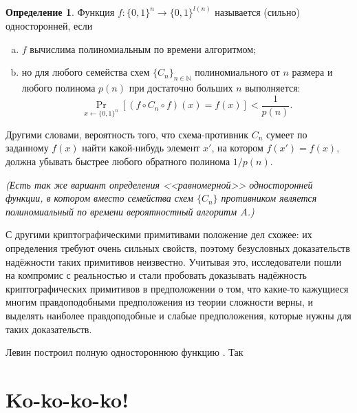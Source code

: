\documentclass[oneside, a4paper]{article}
\theoremstyle{definition}
\newtheorem{definition}{Определение}
\theoremstyle{remark}
\begin{document}
\begin{definition}
Функция $f : \{0, 1\}^n \to \{0, 1\}^{l(n)}$ называется (сильно) односторонней,
если
\begin{enumerate}[(a)]
\item $f$ вычислима полиномиальным по времени алгоритмом;
\item но для любого семейства схем $\{ C_n \}_{n \in \mathbb N}$ полиномиального
от $n$ размера и любого полинома $p(n)$ при достаточно больших $n$ выполняется:
\[
\Pr_{x \gets \{0, 1\}^n}[(f \circ C_n \circ f)(x) = f(x)] < \frac 1 {p(n)}.
\]
\end{enumerate}

Другими словами, вероятность того, что схема-противник $C_n$ сумеет по заданному
$f(x)$ найти какой-нибудь элемент $x'$, на котором $f(x') = f(x)$, должна
убывать быстрее любого обратного полинома $1 / p(n)$.

\emph{(Есть так же вариант определения <<равномерной>> односторонней функции, в
котором вместо семейства схем $\{C_n\}$ противником является полиномиальный по
времени вероятностный алгоритм $A$.)}
\end{definition}


С другими криптографическими примитивами положение дел схожее: их определения
требуют очень сильных свойств, поэтому безусловных доказательств надёжности
таких примитивов неизвестно. Учитывая это, исследователи пошли на компромис
с реальностью и стали пробовать доказывать надёжность криптографических
примитивов в предположении о том, что какие-то кажущиеся многим правдоподобными
предположения из теории сложности верны, и выделять наиболее правдоподобные и
слабые предположения, которые нужны для таких доказательств.

Левин построил полную одностороннюю функцию \cite{complete_owf, complete_owf2}. Так



















\section{Ko-ko-ko-ko!}
\end{document}
